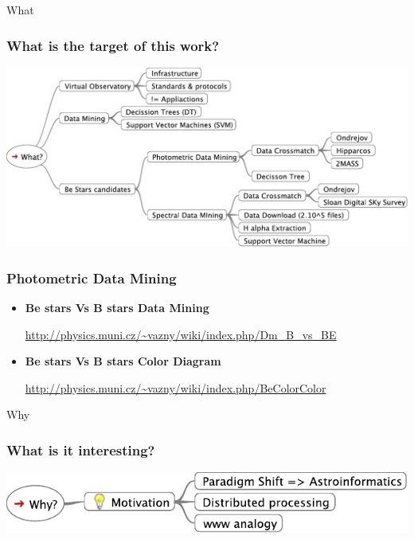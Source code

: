 \documentclass[fleqn]{beamer}
\begin{document}
\begin{section}{What}
  \begin{frame}\frametitle{What is the target of this work?}
  \begin{center}
    \includegraphics[width=1.0\textwidth]{what}    
  \end{center}
\end{frame}

\begin{frame}\frametitle{Photometric Data Mining}
  \begin{itemize}
  \item \textbf{Be stars Vs B stars Data Mining }
    
    \url{http://physics.muni.cz/~vazny/wiki/index.php/Dm_B_vs_BE}
  \item \textbf{Be stars Vs B stars Color Diagram }
    
    \url{http://physics.muni.cz/~vazny/wiki/index.php/BeColorColor}
  \end{itemize}
\end{frame}


\end{section}

\begin{section}{Why}
  \begin{frame}\frametitle{What is it interesting?}
  \begin{center}
    \includegraphics[width=1.0\textwidth]{why}    
  \end{center}
\end{frame}
\end{section}
\end{document}
